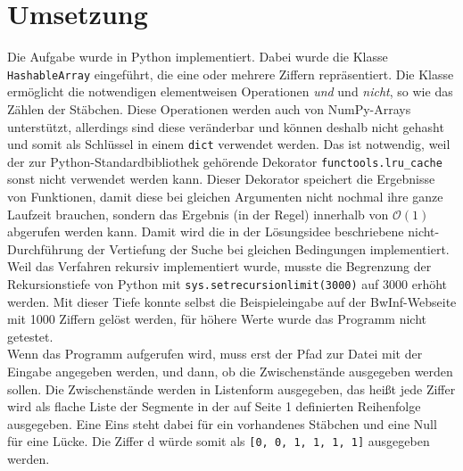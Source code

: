 \documentclass[a4paper,10pt,ngerman]{scrartcl}
\begin{document}
\section{Umsetzung}
Die Aufgabe wurde in Python implementiert. Dabei wurde die Klasse \lstinline|HashableArray| eingeführt, die eine oder mehrere Ziffern repräsentiert. Die Klasse ermöglicht die notwendigen elementweisen Operationen \textit{und} und \textit{nicht}, so wie das Zählen der Stäbchen. Diese Operationen werden auch von NumPy-Arrays unterstützt, allerdings sind diese veränderbar und können deshalb nicht gehasht und somit als Schlüssel in einem \lstinline|dict| verwendet werden. Das ist notwendig, weil der zur Python-Standardbibliothek gehörende Dekorator \lstinline|functools.lru_cache| sonst nicht verwendet werden kann. Dieser Dekorator speichert die Ergebnisse von Funktionen, damit diese bei gleichen Argumenten nicht nochmal ihre ganze Laufzeit brauchen, sondern das Ergebnis (in der Regel) innerhalb von $\mathcal{O}(1)$ abgerufen werden kann. Damit wird die in der Lösungsidee beschriebene nicht-Durchführung der Vertiefung der Suche bei gleichen Bedingungen implementiert. Weil das Verfahren rekursiv implementiert wurde, musste die Begrenzung der Rekursionstiefe von Python mit \lstinline|sys.setrecursionlimit(3000)| auf 3000 erhöht werden. Mit dieser Tiefe konnte selbst die Beispieleingabe auf der BwInf-Webseite mit 1000 Ziffern gelöst werden, für höhere Werte wurde das Programm nicht getestet. \\
Wenn das Programm aufgerufen wird, muss erst der Pfad zur Datei mit der Eingabe angegeben werden, und dann, ob die Zwischenstände ausgegeben werden sollen. Die Zwischenstände werden in Listenform ausgegeben, das heißt jede Ziffer wird als flache Liste der Segmente in der auf Seite 1 definierten Reihenfolge ausgegeben. Eine Eins steht dabei für ein vorhandenes Stäbchen und eine Null für eine Lücke. Die Ziffer d würde somit als \lstinline|[0, 0, 1, 1, 1, 1]| ausgegeben werden. 
\end{document}
